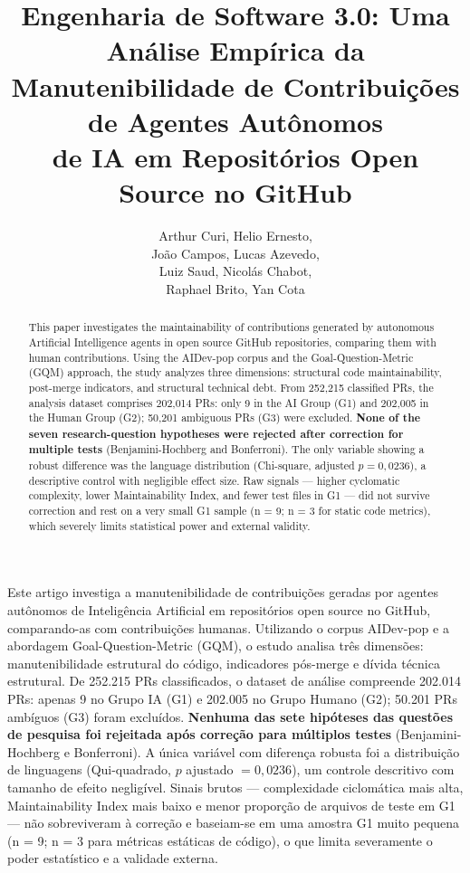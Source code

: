 \documentclass[12pt]{article}
\title{Engenharia de Software 3.0: Uma Análise Empírica da\\
Manutenibilidade de Contribuições de Agentes Autônomos\\
de IA em Repositórios Open Source no GitHub}
\author{Arthur Curi, Helio Ernesto,\\
        João Campos, Lucas Azevedo,\\
        Luiz Saud, Nicolás Chabot,\\
        Raphael Brito, Yan Cota}
\begin{document}
\maketitle

\begin{abstract}
This paper investigates the maintainability of contributions generated by
autonomous Artificial Intelligence agents in open source GitHub repositories,
comparing them with human contributions. Using the AIDev-pop corpus and the
Goal-Question-Metric (GQM) approach, the study analyzes three dimensions:
structural code maintainability, post-merge indicators, and structural
technical debt. From 252{,}215 classified PRs, the analysis dataset comprises
202{,}014 PRs: only 9 in the AI Group (G1) and 202{,}005 in the Human Group
(G2); 50{,}201 ambiguous PRs (G3) were excluded. \textbf{None of the seven
research-question hypotheses were rejected after correction for multiple
tests} (Benjamini-Hochberg and Bonferroni). The only variable showing a
robust difference was the language distribution (Chi-square, adjusted
$p = 0{,}0236$), a descriptive control with negligible effect size. Raw
signals --- higher cyclomatic complexity, lower Maintainability Index, and
fewer test files in G1 --- did not survive correction and rest on a very small
G1 sample (n = 9; n = 3 for static code metrics), which severely limits
statistical power and external validity.
\end{abstract}

\begin{resumo}
Este artigo investiga a manutenibilidade de contribuições geradas por agentes
autônomos de Inteligência Artificial em repositórios open source no GitHub,
comparando-as com contribuições humanas. Utilizando o corpus AIDev-pop e a
abordagem Goal-Question-Metric (GQM), o estudo analisa três dimensões:
manutenibilidade estrutural do código, indicadores pós-merge e dívida técnica
estrutural. De 252.215 PRs classificados, o dataset de análise compreende
202.014 PRs: apenas 9 no Grupo IA (G1) e 202.005 no Grupo Humano (G2); 50.201
PRs ambíguos (G3) foram excluídos. \textbf{Nenhuma das sete hipóteses das
questões de pesquisa foi rejeitada após correção para múltiplos testes}
(Benjamini-Hochberg e Bonferroni). A única variável com diferença robusta foi
a distribuição de linguagens (Qui-quadrado, $p$ ajustado $= 0{,}0236$), um
controle descritivo com tamanho de efeito negligível. Sinais brutos ---
complexidade ciclomática mais alta, Maintainability Index mais baixo e menor
proporção de arquivos de teste em G1 --- não sobreviveram à correção e
baseiam-se em uma amostra G1 muito pequena (n = 9; n = 3 para métricas
estáticas de código), o que limita severamente o poder estatístico e a
validade externa.
\end{resumo}
\end{document}
